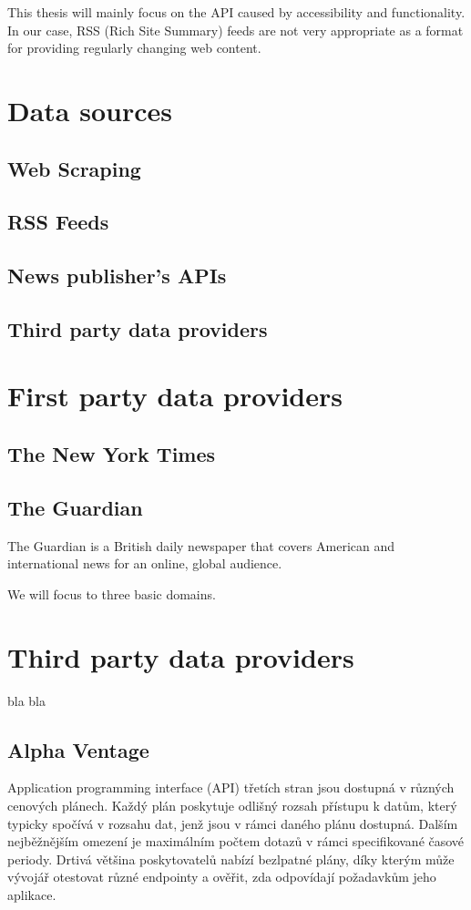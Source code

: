 This thesis will mainly focus on the API caused by accessibility and functionality. In our case, RSS (Rich Site Summary) feeds are not very appropriate as a format for providing regularly changing web content.

\section{Data sources}
\subsection{Web Scraping}
\subsection{RSS Feeds}
\subsection{News publisher's APIs}
\subsection{Third party data providers}

\section{First party data providers}
\subsection{The New York Times}
\subsection{The Guardian}
The Guardian is a British daily newspaper that covers American and international news for an online, global audience.

We will focus to three basic domains.

\section{Third party data providers}
bla bla

\subsection{Alpha Ventage}
Application programming interface (API) třetích stran jsou dostupná v různých cenových plánech. Každý plán poskytuje odlišný rozsah přístupu k datům, který typicky spočívá v rozsahu dat, jenž jsou v rámci daného plánu dostupná. Dalším nejběžnějším omezení je maximálním počtem dotazů v rámci specifikované časové periody. Drtivá většina poskytovatelů nabízí bezlpatné plány, díky kterým může vývojář otestovat různé endpointy a ověřit, zda odpovídají požadavkům jeho aplikace.

